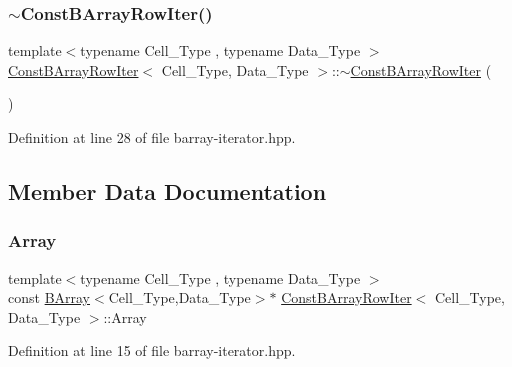 \subsubsection{\texorpdfstring{$\sim$\+Const\+B\+Array\+Row\+Iter()}{~ConstBArrayRowIter()}}
{\footnotesize\ttfamily template$<$typename Cell\+\_\+\+Type , typename Data\+\_\+\+Type $>$ \\
\hyperlink{class_const_b_array_row_iter}{Const\+B\+Array\+Row\+Iter}$<$ Cell\+\_\+\+Type, Data\+\_\+\+Type $>$\+::$\sim$\hyperlink{class_const_b_array_row_iter}{Const\+B\+Array\+Row\+Iter} (\begin{DoxyParamCaption}{ }\end{DoxyParamCaption})\hspace{0.3cm}{\ttfamily [inline]}}



Definition at line 28 of file barray-\/iterator.\+hpp.



\subsection{Member Data Documentation}
\mbox{\label{class_const_b_array_row_iter_ae7f5ef61225621953a664e73c6153ed3}} 
\subsubsection{\texorpdfstring{Array}{Array}}
{\footnotesize\ttfamily template$<$typename Cell\+\_\+\+Type , typename Data\+\_\+\+Type $>$ \\
const \hyperlink{class_b_array}{B\+Array}$<$Cell\+\_\+\+Type,Data\+\_\+\+Type$>$$\ast$ \hyperlink{class_const_b_array_row_iter}{Const\+B\+Array\+Row\+Iter}$<$ Cell\+\_\+\+Type, Data\+\_\+\+Type $>$\+::Array}



Definition at line 15 of file barray-\/iterator.\+hpp.

\mbox{\label{class_const_b_array_row_iter_a1cc52bf86768fc2438f1f13df70d3679}} 
